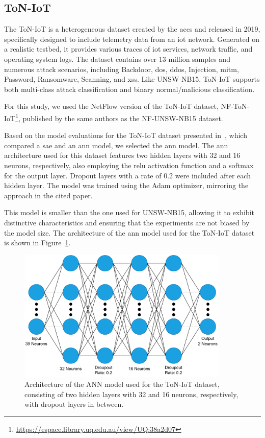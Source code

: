 \subsection{ToN-IoT}
\label{sec:ton-iot}

The ToN-IoT is a heterogeneous dataset created by the  \ac{accs} and released in 2019, specifically designed to include telemetry data from an \ac{iot} network. Generated on a realistic testbed, it provides various traces of \ac{iot} services, network traffic, and operating system logs. The dataset contains over 13 million samples and numerous attack scenarios, including Backdoor, \ac{dos}, \ac{ddos}, Injection, \ac{mitm}, Password, Ransomware, Scanning, and \ac{xss}. Like UNSW-NB15, ToN-IoT supports both multi-class attack classification and binary normal/malicious classification.

For this study, we used the NetFlow version of the ToN-IoT dataset, NF-ToN-IoT\footnote{\url{https://espace.library.uq.edu.au/view/UQ:38a2d07}}, published by the same authors as the NF-UNSW-NB15 dataset.

Based on the model evaluations for the ToN-IoT dataset presented in~\cite{kumar2021p2idf}, which compared a \ac{sae} and an \ac{ann} model, we selected the \ac{ann} model. The \ac{ann} architecture used for this dataset features two hidden layers with 32 and 16 neurons, respectively, also employing the \ac{relu} activation function and a softmax for the output layer. Dropout layers with a rate of 0.2 were included after each hidden layer. The model was trained using the Adam optimizer, mirroring the approach in the cited paper.

This model is smaller than the one used for UNSW-NB15, allowing it to exhibit distinctive characteristics and ensuring that the experiments are not biased by the model size. The architecture of the \ac{ann} model used for the ToN-IoT dataset is shown in Figure~\ref{fig:ton_nn}.

\begin{figure}[!htb]
    \centering
    \includegraphics[width=0.9\textwidth]{figs/ton_nn.pdf}
    \caption[ToN-IoT dataset model architecture]{Architecture of the ANN model used for the ToN-IoT dataset, consisting of two hidden layers with 32 and 16 neurons, respectively, with dropout layers in between.}
    \label{fig:ton_nn}
\end{figure}

